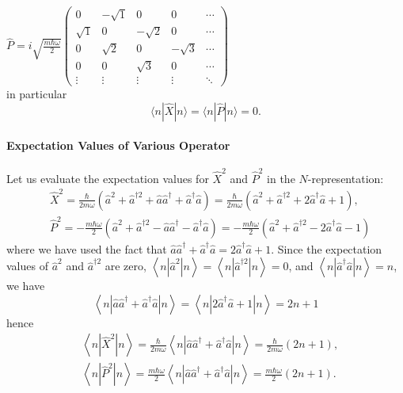 \begin{enumerate}
 	$\hat{P}=i \sqrt{\frac{m \hbar \omega}{2}}\left(\begin{array}{ccccc}
 		0 & -\sqrt{1} & 0 & 0 & \cdots \\
 		\sqrt{1} & 0 & -\sqrt{2} & 0 & \cdots \\
 		0 & \sqrt{2} & 0 & -\sqrt{3} & \cdots \\
 		0 & 0 & \sqrt{3} & 0 & \cdots \\
 		\vdots & \vdots & \vdots & \vdots & \ddots
 	\end{array}\right)$\\
 	in particular
 	$$
 	\langle n|\hat{X}| n\rangle=\langle n|\hat{P}| n\rangle=0 .
 	$$
 \end{enumerate}
\paragraph{Expectation Values of Various Operator}
Let us evaluate the expectation values for $\hat{X}^{2}$ and $\hat{P}^{2}$ in the $N$-representation:
$$
\begin{aligned}
&\hat{X}^{2}=\frac{\hbar}{2 m \omega}\left(\hat{a}^{2}+\hat{a}^{\dagger 2}+\hat{a} \hat{a}^{\dagger}+\hat{a}^{\dagger} \hat{a}\right)=\frac{\hbar}{2 m \omega}\left(\hat{a}^{2}+\hat{a}^{\dagger 2}+2 \hat{a}^{\dagger} \hat{a}+1\right), \\
&\hat{P}^{2}=-\frac{m \hbar \omega}{2}\left(\hat{a}^{2}+\hat{a}^{\dagger 2}-\hat{a} \hat{a}^{\dagger}-\hat{a}^{\dagger} \hat{a}\right)=-\frac{m \hbar \omega}{2}\left(\hat{a}^{2}+\hat{a}^{\dagger 2}-2 \hat{a}^{\dagger} \hat{a}-1\right)
\end{aligned}
$$
where we have used the fact that $\hat{a} \hat{a}^{\dagger}+\hat{a}^{\dagger} \hat{a}=2 \hat{a}^{\dagger} \hat{a}+1 .$ Since the expectation values of $\hat{a}^{2}$ and $\hat{a}^{\dagger 2}$ are zero, $\left\langle n\left|\hat{a}^{2}\right| n\right\rangle=\left\langle n\left|\hat{a}^{\dagger 2}\right| n\right\rangle=0$, and $\left\langle n\left|\hat{a}^{\dagger} \hat{a}\right| n\right\rangle=n$, we have\\
$$\left\langle n\left|\hat{a} \hat{a}^{\dagger}+\hat{a}^{\dagger} \hat{a}\right| n\right\rangle=\left\langle n\left|2 \hat{a}^{\dagger} \hat{a}+1\right| n\right\rangle=2 n+1$$
hence
$$\begin{aligned}
	&\left\langle n\left|\hat{X}^{2}\right| n\right\rangle=\frac{\hbar}{2 m \omega}\left\langle n\left|\hat{a} \hat{a}^{\dagger}+\hat{a}^{\dagger} \hat{a}\right| n\right\rangle=\frac{\hbar}{2 m \omega}(2 n+1), \\
	&\left\langle n\left|\hat{P}^{2}\right| n\right\rangle=\frac{m \hbar \omega}{2}\left\langle n\left|\hat{a} \hat{a}^{\dagger}+\hat{a}^{\dagger} \hat{a}\right| n\right\rangle=\frac{m \hbar \omega}{2}(2 n+1) .
\end{aligned}$$
